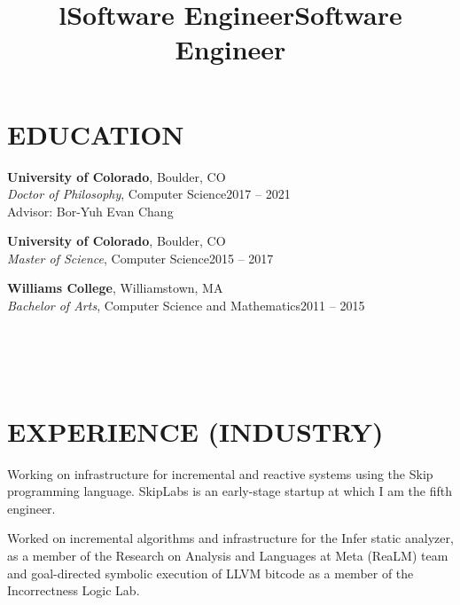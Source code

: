 \documentclass[margin,10pt]{res}
\begin{document}
\begin{resume}

\section{EDUCATION}
\textbf{University of Colorado}, Boulder, CO\\
{\sl Doctor of Philosophy}, Computer Science\hfill 2017 -- 2021\\
Advisor: Bor-Yuh Evan Chang

\textbf{University of Colorado}, Boulder, CO\\
{\sl Master of Science}, Computer Science\hfill 2015 -- 2017

\textbf{Williams College}, Williamstown, MA\\
{\sl Bachelor of Arts}, Computer Science and Mathematics\hfill 2011 -- 2015


\begin{format}
\title{l}\\
\\
\body\\
\end{format}

\section{EXPERIENCE (INDUSTRY)}
\title{\textbf{Software Engineer}}
\begin{position}
Working on infrastructure for incremental and reactive systems using the Skip programming language.  SkipLabs is an early-stage startup at which I am the fifth engineer.
\end{position}
\title{\textbf{Software Engineer}}
\begin{position}
  Worked on incremental algorithms and infrastructure for the Infer static analyzer, as a member of the Research on Analysis and Languages at Meta (ReaLM) team and goal-directed symbolic execution of LLVM bitcode as a member of the Incorrectness Logic Lab.
\end{position}


\end{resume}
\end{document}
